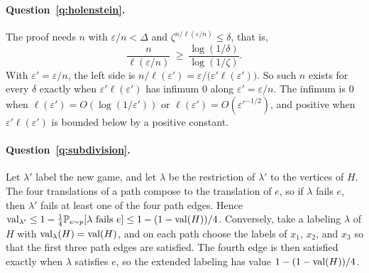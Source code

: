 \paragraph{Question~\ref{q:holenstein}.} The proof needs $n$ with $\varepsilon/n<\Delta$ and $\zeta^{n/\ell(\varepsilon/n)}\le\delta$, that is,
\[
\frac{n}{\ell(\varepsilon/n)}\ \ge\ \frac{\log(1/\delta)}{\log(1/\zeta)}.
\]
With $\varepsilon'=\varepsilon/n$, the left side is $n/\ell(\varepsilon')=\varepsilon/\bigl(\varepsilon'\ell(\varepsilon')\bigr)$. So such $n$ exists for every $\delta$ exactly when $\varepsilon'\ell(\varepsilon')$ has infimum $0$ along $\varepsilon'=\varepsilon/n$. The infimum is $0$ when $\ell(\varepsilon')=O(\log(1/\varepsilon'))$ or $\ell(\varepsilon')=O(\varepsilon'^{-1/2})$, and positive when $\varepsilon'\ell(\varepsilon')$ is bounded below by a positive constant.

\paragraph{Question~\ref{q:subdivision}.} Let $\lambda'$ label the new game, and let $\lambda$ be the restriction of $\lambda'$ to the vertices of $H$. The four translations of a path compose to the translation of $e$, so if $\lambda$ fails $e$, then $\lambda'$ fails at least one of the four path edges. Hence $\operatorname{val}_{\lambda'}\le1-\tfrac14\mathbb{P}_{e\sim p}[\lambda\text{ fails }e]\le1-(1-\operatorname{val}(H))/4$. Conversely, take a labeling $\lambda$ of $H$ with $\operatorname{val}_\lambda(H)=\operatorname{val}(H)$, and on each path choose the labels of $x_1$, $x_2$, and $x_3$ so that the first three path edges are satisfied. The fourth edge is then satisfied exactly when $\lambda$ satisfies $e$, so the extended labeling has value $1-(1-\operatorname{val}(H))/4$.
